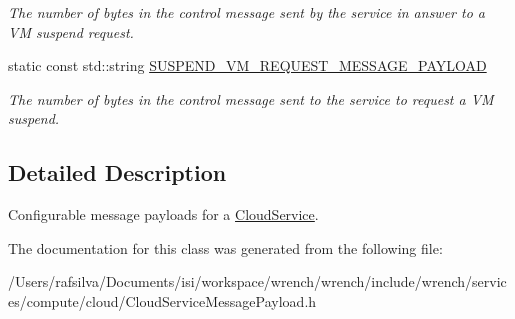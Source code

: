 \begin{DoxyCompactItemize}
\begin{DoxyCompactList}\small\item\em The number of bytes in the control message sent by the service in answer to a VM suspend request. \end{DoxyCompactList}\item 
\mbox{\label{classwrench_1_1_cloud_service_message_payload_a8eb571b25e35581f6e08126bdd0e0799}} 
static const std\+::string \hyperlink{classwrench_1_1_cloud_service_message_payload_a8eb571b25e35581f6e08126bdd0e0799}{S\+U\+S\+P\+E\+N\+D\+\_\+\+V\+M\+\_\+\+R\+E\+Q\+U\+E\+S\+T\+\_\+\+M\+E\+S\+S\+A\+G\+E\+\_\+\+P\+A\+Y\+L\+O\+AD}
\begin{DoxyCompactList}\small\item\em The number of bytes in the control message sent to the service to request a VM suspend. \end{DoxyCompactList}\end{DoxyCompactItemize}


\subsection{Detailed Description}
Configurable message payloads for a \hyperlink{classwrench_1_1_cloud_service}{Cloud\+Service}. 

The documentation for this class was generated from the following file\+:\begin{DoxyCompactItemize}
\item 
/\+Users/rafsilva/\+Documents/isi/workspace/wrench/wrench/include/wrench/services/compute/cloud/Cloud\+Service\+Message\+Payload.\+h\end{DoxyCompactItemize}
